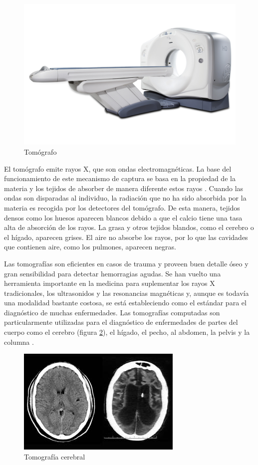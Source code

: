 \begin{figure}[H]
\centering
\includegraphics[scale=0.3]{images/ge_ct_scanner.jpg}
\caption{Tomógrafo}
\label{fig:tomografo}
\end{figure}

El tomógrafo emite rayos X, que son ondas electromagnéticas. La base del funcionamiento de este mecanismo de captura se basa en la propiedad de la materia y los tejidos de absorber de manera diferente estos rayos \citep{prince2006medical}.
Cuando las ondas son disparadas al individuo, la radiación que no ha sido absorbida por la materia es recogida por los detectores del tomógrafo. De esta manera, tejidos densos como los huesos aparecen blancos debido a que el calcio tiene una tasa alta de absorción de los rayos. La grasa y otros tejidos blandos, como el cerebro o el hígado, aparecen grises. El aire no absorbe los rayos, por lo que las cavidades que contienen aire, como los pulmones, aparecen negras.

Las tomografías son eficientes en casos de trauma y proveen buen detalle óseo y gran sensibilidad para detectar hemorragias agudas. Se han vuelto una herramienta importante en la medicina para suplementar los rayos X tradicionales, los ultrasonidos y las resonancias magnéticas y, aunque es todavía una modalidad bastante costosa, se está estableciendo como el estándar para el diagnóstico de muchas enfermedades. Las tomografías computadas son particularmente utilizadas para el diagnóstico de enfermedades de partes del cuerpo como el cerebro (figura \ref{fig:tomografia_cerebral}), el hígado, el pecho, al abdomen, la pelvis y la columna \citep{sharma2010automated}.

\begin{figure}[H]
\centering
\includegraphics[scale=1]{images/Schiavo_catscan.jpg}
\caption{Tomografía cerebral}
\label{fig:tomografia_cerebral}
\end{figure}

